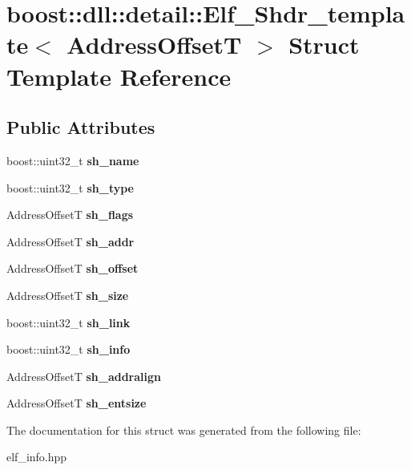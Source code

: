 \hypertarget{a00087}{}\section{boost\+:\+:dll\+:\+:detail\+:\+:Elf\+\_\+\+Shdr\+\_\+template$<$ Address\+OffsetT $>$ Struct Template Reference}
\label{a00087}
\subsection*{Public Attributes}
\begin{DoxyCompactItemize}
\item 
boost\+::uint32\+\_\+t {\bfseries sh\+\_\+name}\hypertarget{a00087_af74b85fd375874942acab42fb236938b}{}\label{a00087_af74b85fd375874942acab42fb236938b}

\item 
boost\+::uint32\+\_\+t {\bfseries sh\+\_\+type}\hypertarget{a00087_aef81ee9415e932f037457039ecb6062a}{}\label{a00087_aef81ee9415e932f037457039ecb6062a}

\item 
Address\+OffsetT {\bfseries sh\+\_\+flags}\hypertarget{a00087_a0cf665258d1353d703dbe5f03b06377c}{}\label{a00087_a0cf665258d1353d703dbe5f03b06377c}

\item 
Address\+OffsetT {\bfseries sh\+\_\+addr}\hypertarget{a00087_a96484407d371204d2cdf512c946a3035}{}\label{a00087_a96484407d371204d2cdf512c946a3035}

\item 
Address\+OffsetT {\bfseries sh\+\_\+offset}\hypertarget{a00087_a218d431d671c785239cbe32d5f566329}{}\label{a00087_a218d431d671c785239cbe32d5f566329}

\item 
Address\+OffsetT {\bfseries sh\+\_\+size}\hypertarget{a00087_a0e8fbbadfb65a2c456951a632a114b0f}{}\label{a00087_a0e8fbbadfb65a2c456951a632a114b0f}

\item 
boost\+::uint32\+\_\+t {\bfseries sh\+\_\+link}\hypertarget{a00087_a0f3c4d6a3f6db4ce3debe84bfab65aa4}{}\label{a00087_a0f3c4d6a3f6db4ce3debe84bfab65aa4}

\item 
boost\+::uint32\+\_\+t {\bfseries sh\+\_\+info}\hypertarget{a00087_ab2ae82258ef53873e52f5711efd46f69}{}\label{a00087_ab2ae82258ef53873e52f5711efd46f69}

\item 
Address\+OffsetT {\bfseries sh\+\_\+addralign}\hypertarget{a00087_a8b78c53bdbdd717f69a20f53427d99d5}{}\label{a00087_a8b78c53bdbdd717f69a20f53427d99d5}

\item 
Address\+OffsetT {\bfseries sh\+\_\+entsize}\hypertarget{a00087_a736b1d41e2034475f8dcf3119614e88d}{}\label{a00087_a736b1d41e2034475f8dcf3119614e88d}

\end{DoxyCompactItemize}


The documentation for this struct was generated from the following file\+:\begin{DoxyCompactItemize}
\item 
elf\+\_\+info.\+hpp\end{DoxyCompactItemize}
